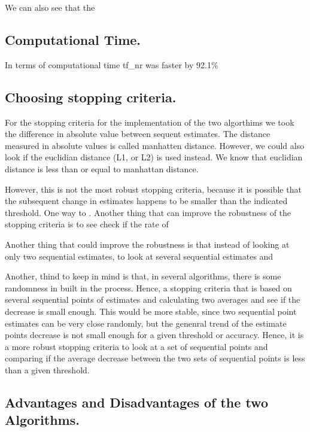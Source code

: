 \documentclass[]{article}
\begin{document}
We can also see that the

\subsection{Computational Time.}\label{computational-time.}

In terms of computational time tf\_nr was faster by 92.1\%

\subsection{Choosing stopping
criteria.}\label{choosing-stopping-criteria.}

For the stopping criteria for the implementation of the two algorthims
we took the difference in absolute value between sequent estimates. The
distance measured in absolute values is called manhatten distance.
However, we could also look if the euclidian distance (L1, or L2) is
used instead. We know that euclidian distance is less than or equal to
manhattan distance.

However, this is not the most robust stopping criteria, because it is
possible that the subsequent change in estimates happens to be smaller
than the indicated threshold. One way to . Another thing that can
improve the robustness of the stopping criteria is to see check if the
rate of

Another thing that could improve the robustness is that instead of
looking at only two sequential estimates, to look at several sequential
estimates and

Another, thind to keep in mind is that, in several algorithms, there is
some randomness in built in the process. Hence, a stopping criteria that
is based on several sequential points of estimates and calculating two
averages and see if the decrease is small enough. This would be more
stable, since two sequential point estimates can be very close randomly,
but the genenral trend of the estimate points decrease is not small
enough for a given threshold or accuracy. Hence, it is a more robust
stopping criteria to look at a set of sequential points and comparing if
the average decrease between the two sets of sequential points is less
than a given threshold.

\subsection{Advantages and Disadvantages of the two
Algorithms.}\label{advantages-and-disadvantages-of-the-two-algorithms.}
\end{document}
